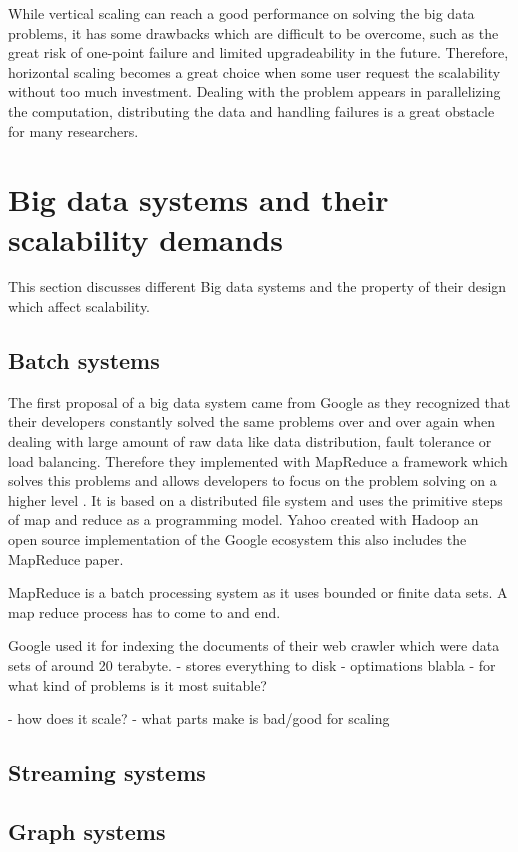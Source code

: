 \documentclass{format}
\begin{document}
While vertical scaling can reach a good performance on solving the big data problems, it has some drawbacks which are difficult to be overcome, such as the great risk of one-point failure and limited upgradeability in the future. Therefore, horizontal scaling becomes a great choice when some user request the scalability without too much investment. Dealing with the problem appears in parallelizing the computation, distributing the data and handling failures is a great obstacle for many researchers. 

\section{Big data systems and their scalability demands}
This section discusses different Big data systems and the property of their design which affect scalability.

\subsection{Batch systems}

The first proposal of a big data system came from Google as they recognized that their developers constantly solved the same problems over and over again when dealing with large amount of raw data like data distribution, fault tolerance or load balancing. Therefore they implemented with MapReduce a framework which solves this problems and allows developers to focus on the problem solving on a higher level \cite{dean2008mapreduce}. It is based on a distributed file system and uses the primitive steps of map and reduce as a programming model. Yahoo created with Hadoop an open source implementation of the Google ecosystem this also includes the MapReduce paper.

MapReduce is a batch processing system as it uses bounded or finite data sets. A map reduce process has to come to and end. 

Google used it for indexing the documents of their web crawler which were data sets of around 20 terabyte.
- stores everything to disk
- optimations blabla
- for what kind of problems is it most suitable?

- how does it scale?
- what parts make is bad/good for scaling

\subsection{Streaming systems}

\subsection{Graph systems}
\end{document}
